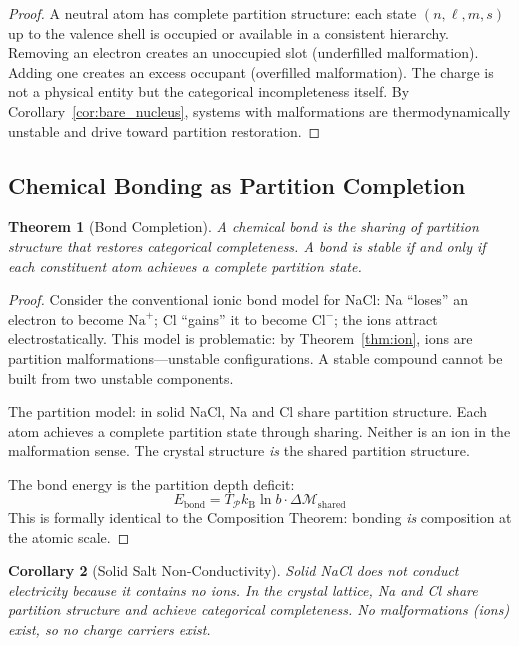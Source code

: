 \documentclass[twocolumn,10pt,a4paper]{article}
\theoremstyle{plain}
\newtheorem{theorem}{Theorem}[section]
\newtheorem{corollary}[theorem]{Corollary}
\theoremstyle{definition}
\theoremstyle{remark}
\newcommand{\kB}{k_{\mathrm{B}}}
\newcommand{\Depth}{\mathcal{M}}
\newcommand{\Partition}{\mathcal{P}}
\begin{document}
\begin{proof}
A neutral atom has complete partition structure: each state $(n, \ell, m, s)$ up to the valence shell is occupied or available in a consistent hierarchy. Removing an electron creates an unoccupied slot (underfilled malformation). Adding one creates an excess occupant (overfilled malformation). The charge is not a physical entity but the categorical incompleteness itself. By Corollary~\ref{cor:bare_nucleus}, systems with malformations are thermodynamically unstable and drive toward partition restoration.
\end{proof}

\subsection{Chemical Bonding as Partition Completion}

\begin{theorem}[Bond Completion]
\label{thm:bond}
A chemical bond is the sharing of partition structure that restores categorical completeness. A bond is stable if and only if each constituent atom achieves a complete partition state.
\end{theorem}

\begin{proof}
Consider the conventional ionic bond model for NaCl: Na ``loses'' an electron to become $\mathrm{Na}^+$; Cl ``gains'' it to become $\mathrm{Cl}^-$; the ions attract electrostatically. This model is problematic: by Theorem~\ref{thm:ion}, ions are partition malformations---unstable configurations. A stable compound cannot be built from two unstable components.

The partition model: in solid NaCl, Na and Cl share partition structure. Each atom achieves a complete partition state through sharing. Neither is an ion in the malformation sense. The crystal structure \emph{is} the shared partition structure.

The bond energy is the partition depth deficit:
\begin{equation}
    E_{\mathrm{bond}} = T_\Partition \kB \ln b \cdot \Delta\Depth_{\mathrm{shared}}
\end{equation}
This is formally identical to the Composition Theorem: bonding \emph{is} composition at the atomic scale.
\end{proof}

\begin{corollary}[Solid Salt Non-Conductivity]
\label{cor:solid_salt}
Solid NaCl does not conduct electricity because it contains no ions. In the crystal lattice, Na and Cl share partition structure and achieve categorical completeness. No malformations (ions) exist, so no charge carriers exist.
\end{corollary}
\end{document}
